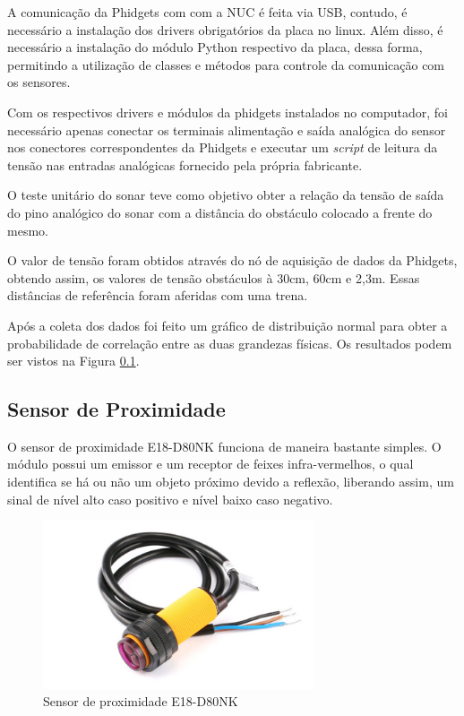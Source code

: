 		A comunicação da Phidgets com com a NUC é feita via USB, contudo, é necessário a instalação dos drivers obrigatórios da placa no linux. Além disso, é necessário a instalação do módulo Python respectivo da placa, dessa forma, permitindo a utilização de classes e métodos para controle da comunicação com os sensores.
		
		Com os respectivos drivers e módulos da phidgets instalados no computador, foi necessário apenas conectar os terminais alimentação e saída analógica do sensor nos conectores correspondentes da Phidgets e executar um \textit{script} de leitura da tensão nas entradas analógicas fornecido pela própria fabricante. 
		
		O teste unitário do sonar teve como objetivo obter a relação da tensão de saída do pino analógico do sonar com a distância do obstáculo colocado a frente do mesmo.
		
		O valor de tensão foram obtidos através do nó de aquisição de dados da Phidgets, obtendo assim, os valores de tensão obstáculos à 30cm, 60cm e 2,3m. Essas distâncias de referência foram aferidas com uma trena.
		
		Após a coleta dos dados foi feito um gráfico de distribuição normal para obter a probabilidade de correlação entre as duas grandezas físicas. Os resultados podem ser vistos na Figura \ref{}.
	
	\subsection{Sensor de Proximidade}
		O sensor de proximidade E18-D80NK funciona de maneira bastante simples. O módulo possui um emissor e um receptor de feixes infra-vermelhos, o qual identifica se há ou não um objeto próximo devido a reflexão, liberando assim, um sinal de nível alto caso positivo e nível baixo caso negativo.
		
		\begin{figure}[!ht]
		   \centering
		   \includegraphics[width=8cm]{Figures/proximity_sensor.jpg}
		   \caption{Sensor de proximidade E18-D80NK}
		   \label{fig:E18-D80NK}
		\end{figure}
		
